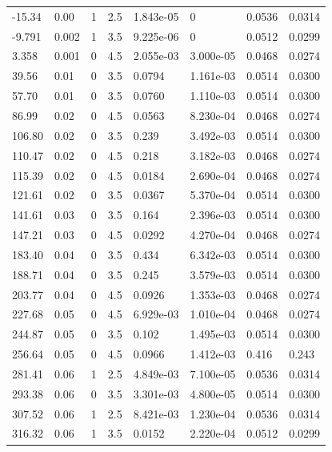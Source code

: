 \documentclass[preview]{standalone}
\begin{document}
{{\begin{tabular}{L{1.2cm}C{1.2cm} C{0.3cm}C{0.5cm} C{1.4cm}C{1.4cm} C{1.4cm}C{1.4cm}}
  -15.34  &  0.00  & 1     & 2.5 &  1.843e-05  & 0  & 0.0536 &  0.0314   \\ 
  -9.791  &  0.002  & 1     & 3.5 &  9.225e-06  & 0  & 0.0512 &  0.0299   \\ 
  3.358  &  0.001  & 0     & 4.5 &  2.055e-03  & 3.000e-05  & 0.0468 &  0.0274   \\ 
  39.56  &  0.01  & 0     & 3.5 &  0.0794  & 1.161e-03  & 0.0514 &  0.0300   \\ 
  57.70  &  0.01  & 0     & 3.5 &  0.0760  & 1.110e-03  & 0.0514 &  0.0300   \\ 
  86.99  &  0.02  & 0     & 4.5 &  0.0563  & 8.230e-04  & 0.0468 &  0.0274   \\ 
  106.80  &  0.02  & 0     & 3.5 &  0.239  & 3.492e-03  & 0.0514 &  0.0300   \\ 
  110.47  &  0.02  & 0     & 4.5 &  0.218  & 3.182e-03  & 0.0468 &  0.0274   \\ 
  115.39  &  0.02  & 0     & 4.5 &  0.0184  & 2.690e-04  & 0.0468 &  0.0274   \\ 
  121.61  &  0.02  & 0     & 3.5 &  0.0367  & 5.370e-04  & 0.0514 &  0.0300   \\ 
  141.61  &  0.03  & 0     & 3.5 &  0.164  & 2.396e-03  & 0.0514 &  0.0300   \\ 
  147.21  &  0.03  & 0     & 4.5 &  0.0292  & 4.270e-04  & 0.0468 &  0.0274   \\ 
  183.40  &  0.04  & 0     & 3.5 &  0.434  & 6.342e-03  & 0.0514 &  0.0300   \\ 
  188.71  &  0.04  & 0     & 3.5 &  0.245  & 3.579e-03  & 0.0514 &  0.0300   \\ 
  203.77  &  0.04  & 0     & 4.5 &  0.0926  & 1.353e-03  & 0.0468 &  0.0274   \\ 
  227.68  &  0.05  & 0     & 4.5 &  6.929e-03  & 1.010e-04  & 0.0468 &  0.0274   \\ 
  244.87  &  0.05  & 0     & 3.5 &  0.102  & 1.495e-03  & 0.0514 &  0.0300   \\ 
  256.64  &  0.05  & 0     & 4.5 &  0.0966  & 1.412e-03  & 0.416 &  0.243   \\ 
  281.41  &  0.06  & 1     & 2.5 &  4.849e-03  & 7.100e-05  & 0.0536 &  0.0314   \\ 
  293.38  &  0.06  & 0     & 3.5 &  3.301e-03  & 4.800e-05  & 0.0514 &  0.0300   \\ 
  307.52  &  0.06  & 1     & 2.5 &  8.421e-03  & 1.230e-04  & 0.0536 &  0.0314   \\ 
  316.32  &  0.06  & 1     & 3.5 &  0.0152  & 2.220e-04  & 0.0512 &  0.0299   \\ 

\end{tabular}}}
\end{document}
